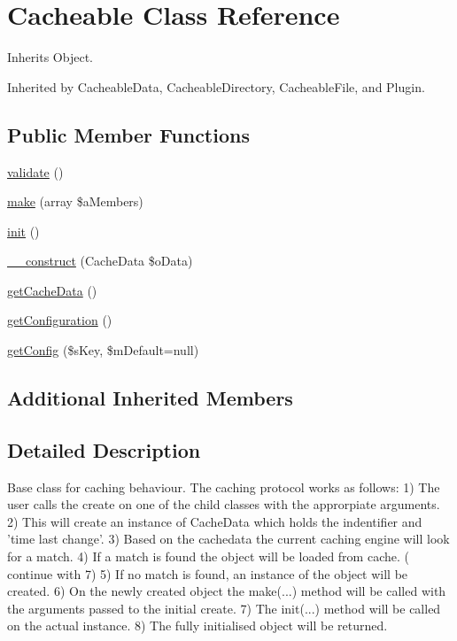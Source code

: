 \hypertarget{class_cacheable}{\section{Cacheable Class Reference}
\label{class_cacheable}
}


Inherits Object.



Inherited by Cacheable\-Data, Cacheable\-Directory, Cacheable\-File, and Plugin.

\subsection*{Public Member Functions}
\begin{DoxyCompactItemize}
\item 
\hyperlink{class_cacheable_ab70b135c0d4c3c3db6be09057ec7e361}{validate} ()
\item 
\hyperlink{class_cacheable_a1443eacff201d0317e4481cda75eb44b}{make} (array \$a\-Members)
\item 
\hyperlink{class_cacheable_a3bda7dd0df982212ce5817b5a30f2284}{init} ()
\item 
\hyperlink{class_cacheable_a16d53ddf3c4ac7217c32df7f0d763454}{\-\_\-\-\_\-construct} (Cache\-Data \$o\-Data)
\item 
\hyperlink{class_cacheable_a3825ea17270319f96d27540ae347fcde}{get\-Cache\-Data} ()
\item 
\hyperlink{class_cacheable_a1a737bc8da70a953cc9d21a7654aab6d}{get\-Configuration} ()
\item 
\hyperlink{class_cacheable_a525b1b070b6f528c6bbe1df12194fab1}{get\-Config} (\$s\-Key, \$m\-Default=null)
\end{DoxyCompactItemize}
\subsection*{Additional Inherited Members}


\subsection{Detailed Description}
Base class for caching behaviour. The caching protocol works as follows\-: 1) The user calls the create on one of the child classes with the approrpiate arguments. 2) This will create an instance of Cache\-Data which holds the indentifier and 'time last change'. 3) Based on the cachedata the current caching engine will look for a match. 4) If a match is found the object will be loaded from cache. ( continue with 7) 5) If no match is found, an instance of the object will be created. 6) On the newly created object the make(...) method will be called with the arguments passed to the initial create. 7) The init(...) method will be called on the actual instance. 8) The fully initialised object will be returned.

